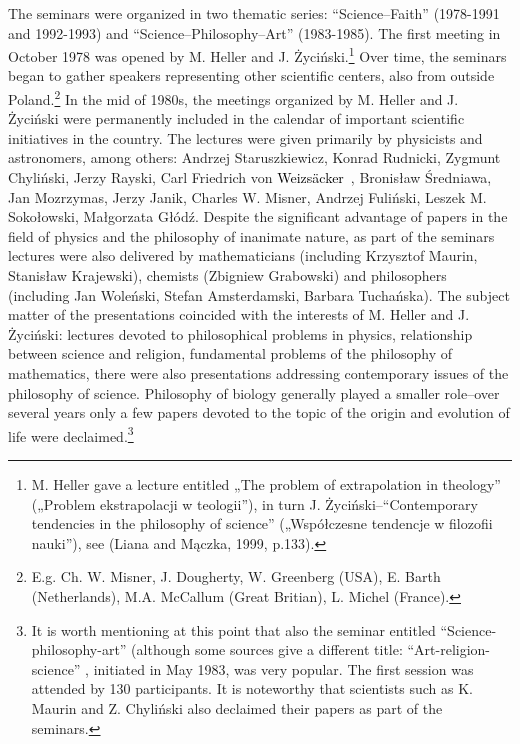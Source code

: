 \documentclass[a4paper]{article}
\begin{document}
The seminars were organized in two thematic series: “Science–Faith” (1978-1991 and 1992-1993) and
“Science–Philosophy–Art” (1983-1985). The first meeting in October 1978 was opened by M. Heller and J.
Życiński.\footnote{ M. Heller gave a lecture entitled „The problem of extrapolation in theology” („Problem
ekstrapolacji w teologii”), in turn J. Życiński–“Contemporary tendencies in the philosophy of science” („Współczesne
tendencje w filozofii nauki”), see \label{ref:RNDPh1P7nkBwe}(Liana and Mączka, 1999, p.133).} Over time, the seminars
began to gather speakers representing other scientific centers, also from outside Poland.\footnote{ E.g. Ch. W. Misner,
J. Dougherty, W. Greenberg (USA), E. Barth (Netherlands), M.A. McCallum (Great Britian), L. Michel (France).} In the
mid of 1980s, the meetings organized by M. Heller and J. Życiński were permanently included in the calendar of
important scientific initiatives in the country. The lectures were given primarily by physicists and astronomers, among
others: Andrzej Staruszkiewicz, Konrad Rudnicki, Zygmunt Chyliński, Jerzy Rayski, Carl Friedrich von
\textcolor{black}{Weizsäcker}\textcolor[rgb]{0.13333334,0.13333334,0.13333334}{~}, Bronisław Średniawa, Jan Mozrzymas,
Jerzy Janik, Charles W. Misner, Andrzej Fuliński, Leszek M. Sokołowski, Małgorzata Głódź. Despite the significant
advantage of papers in the field of physics and the philosophy of inanimate nature, as part of the seminars lectures
were also delivered by mathematicians (including Krzysztof Maurin, Stanisław Krajewski), chemists (Zbigniew Grabowski)
and philosophers (including Jan Woleński, Stefan Amsterdamski, Barbara Tuchańska). The subject matter of the
presentations coincided with the interests of M. Heller and J. Życiński: lectures devoted to philosophical problems in
physics, relationship between science and religion, fundamental problems of the philosophy of mathematics, there were
also presentations addressing contemporary issues of the philosophy of science. Philosophy of biology generally played
a smaller role–over several years only a few papers devoted to the topic of the origin and evolution of life were
declaimed.\footnote{ It is worth mentioning at this point that also the seminar entitled “Science-philosophy-art”
(although some sources give a different title: “Art-religion-science” , initiated in May 1983, was very popular. The
first session was attended by 130 participants. It is noteworthy that scientists such as K. Maurin and Z. Chyliński
also declaimed their papers as part of the seminars. }
\end{document}
